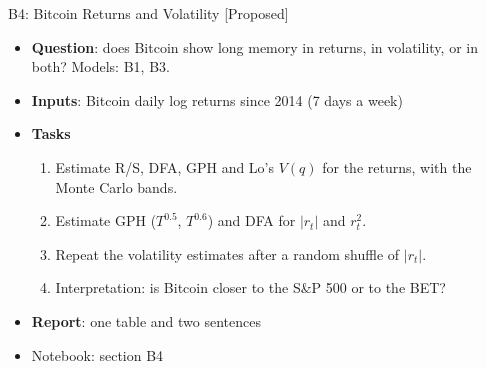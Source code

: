 \begin{frame}{B4: Bitcoin Returns and Volatility [Proposed]}
\itemsize{\footnotesize}
\begin{itemize}
\item \textbf{Question}: does Bitcoin show long memory in returns, in volatility, or in both? Models: B1, B3.
\item \textbf{Inputs}: Bitcoin daily log returns since 2014 (7 days a week)
\item \textbf{Tasks}
\begin{enumerate}
    \item Estimate R/S, DFA, GPH and Lo's $V(q)$ for the returns, with the Monte Carlo bands.
    \item Estimate GPH ($T^{0.5}$, $T^{0.6}$) and DFA for $|r_t|$ and $r_t^2$.
    \item Repeat the volatility estimates after a random shuffle of $|r_t|$.
    \item Interpretation: is Bitcoin closer to the S\&P 500 or to the BET?
\end{enumerate}
\item \textbf{Report}: one table and two sentences
\item Notebook: section B4
\end{itemize}
\end{frame}

